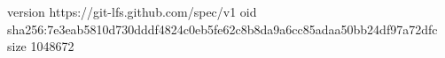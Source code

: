 version https://git-lfs.github.com/spec/v1
oid sha256:7e3eab5810d730dddf4824c0eb5fe62c8b8da9a6cc85adaa50bb24df97a72dfc
size 1048672
